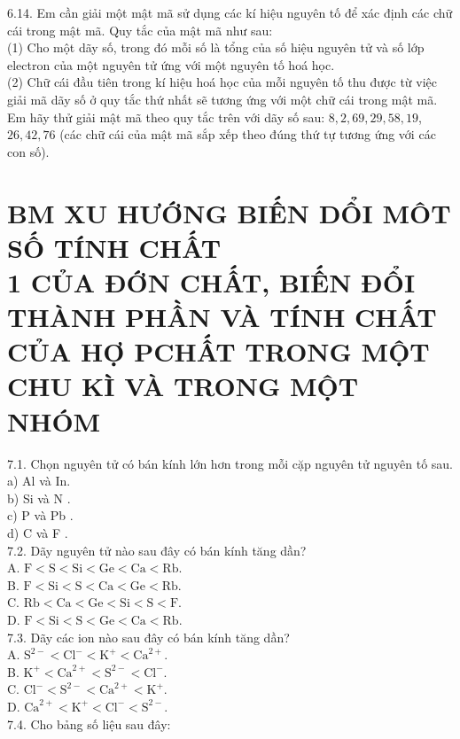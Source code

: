 \documentclass[10pt]{article}
\begin{document}
\begin{enumerate}
6.14. Em cần giải một mật mã sử dụng các kí hiệu nguyên tố để xác định các chữ cái trong mật mã. Quy tắc của mật mã như sau:\\
(1) Cho một dãy số, trong đó mỗi số là tổng của số hiệu nguyên tử và số lớp electron của một nguyên tử ứng với một nguyên tố hoá học.\\
(2) Chữ cái đầu tiên trong kí hiệu hoá học của mỗi nguyên tố thu được từ việc giải mã dãy số ở quy tắc thứ nhất sẽ tương ứng với một chữ cái trong mật mã. Em hãy thử giải mật mã theo quy tắc trên với dãy số sau: $8,2,69,29,58,19$, $26,42,76$ (các chữ cái của mật mã sắp xếp theo đúng thứ tự tương ứng với các con số).
\end{enumerate}

\section*{BM XU HƯỚNG BIẾN DỔI MÔT SỐ TÍNH CHẤT \\
 1 CỦA ĐỚN CHẤT, BIẾN ĐỔI THÀNH PHẦN VÀ TÍNH CHẤT CỦA HỢ PCHẤT TRONG MỘT CHU KÌ VÀ TRONG MỘT NHÓM}
7.1. Chọn nguyên tử có bán kính lớn hơn trong mỗi cặp nguyên tử nguyên tố sau.\\
a) Al và In.\\
b) Si và N .\\
c) P và Pb .\\
d) C và F .\\
7.2. Dãy nguyên tử nào sau đây có bán kính tăng dần?\\
A. $\mathrm{F}<\mathrm{S}<\mathrm{Si}<\mathrm{Ge}<\mathrm{Ca}<\mathrm{Rb}$.\\
B. $\mathrm{F}<\mathrm{Si}<\mathrm{S}<\mathrm{Ca}<\mathrm{Ge}<\mathrm{Rb}$.\\
C. $\mathrm{Rb}<\mathrm{Ca}<\mathrm{Ge}<\mathrm{Si}<\mathrm{S}<\mathrm{F}$.\\
D. $\mathrm{F}<\mathrm{Si}<\mathrm{S}<\mathrm{Ge}<\mathrm{Ca}<\mathrm{Rb}$.\\
7.3. Dãy các ion nào sau đây có bán kính tăng dần?\\
A. $\mathrm{S}^{2-}<\mathrm{Cl}^{-}<\mathrm{K}^{+}<\mathrm{Ca}^{2+}$.\\
B. $\mathrm{K}^{+}<\mathrm{Ca}^{2+}<\mathrm{S}^{2-}<\mathrm{Cl}^{-}$.\\
C. $\mathrm{Cl}^{-}<\mathrm{S}^{2-}<\mathrm{Ca}^{2+}<\mathrm{K}^{+}$.\\
D. $\mathrm{Ca}^{2+}<\mathrm{K}^{+}<\mathrm{Cl}^{-}<\mathrm{S}^{2-}$.\\
7.4. Cho bảng số liệu sau đây:
\end{document}
